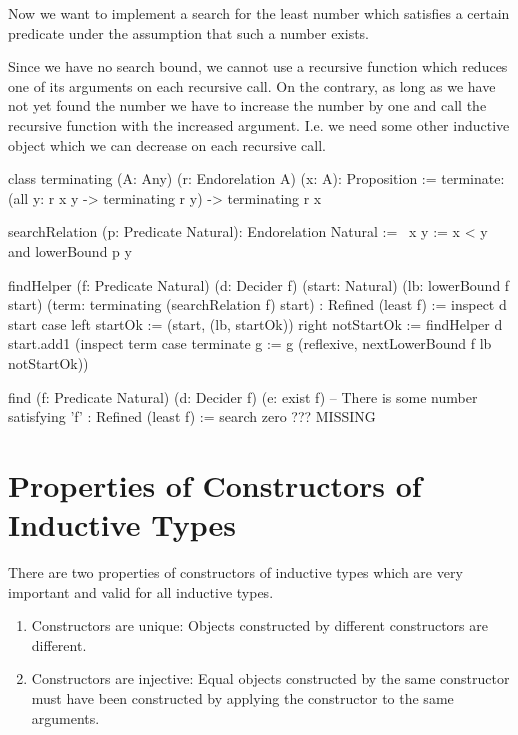 Now we want to implement a search for the least number which satisfies a
certain predicate under the assumption that such a number exists.

Since we have no search bound, we cannot use a recursive function which reduces
one of its arguments on each recursive call. On the contrary, as long as we have
not yet found the number we have to increase the number by one and call the
recursive function with the increased argument. I.e. we need some other
inductive object which we can decrease on each recursive call.

\begin{alba}
    class terminating (A: Any) (r: Endorelation A) (x: A): Proposition :=
        terminate: (all y: r x y -> terminating r y) -> terminating r x
\end{alba}


\begin{alba}
    searchRelation (p: Predicate Natural): Endorelation Natural :=
        \ x y := x < y and lowerBound p y
\end{alba}


\begin{alba}
    findHelper
        (f: Predicate Natural)
        (d: Decider f)
        (start: Natural)
        (lb: lowerBound f start)
        (term: terminating (searchRelation f) start)
        : Refined (least f)
    :=
        inspect d start case
            left startOk :=
                (start, (lb, startOk))
            right notStartOk :=
                findHelper
                    d
                    start.add1
                    (inspect term case
                        terminate g :=
                            g (reflexive, nextLowerBound f lb notStartOk))


    find
        (f: Predicate Natural)
        (d: Decider f)
        (e: exist f)        -- There is some number satisfying 'f'
        : Refined (least f)
    :=
        search zero ???
        MISSING
\end{alba}



\vskip 5mm
\section{Properties of Constructors of Inductive Types}

There are two properties of constructors of inductive types which are very
important and valid for all inductive types.

\begin{enumerate}

\item Constructors are unique: Objects constructed by
different constructors are different.

\item Constructors are injective: Equal objects constructed by the same
constructor must have been constructed by applying the constructor to the same
arguments.

\end{enumerate}


